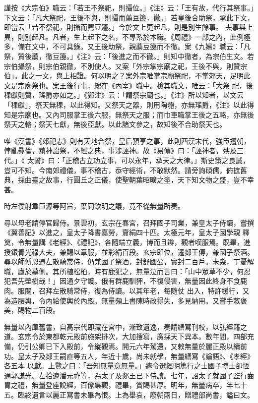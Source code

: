 \begin{pinyinscope}
 謹按《大宗伯》職云：「若王不祭祀，則攝位。」《注》云：「王有故，代行其祭事。」下文云：「凡大祭祀，王後不與，則攝而薦豆籩，徹。」若皇後合助祭，承此下文，即當云「若不祭祀，則攝而薦豆籩。」今於文上更起凡，則是別生餘事。
 夫事與上異，則別起凡。凡者，生上起下之名，不專系於本職。《周禮》一部之內，此例極多，備在文中，不可具錄。又王後助祭，親薦豆籩而不徹。案《九嬪》職云：「凡祭，贊後薦，徹豆籩。」《注》云：「後進之而不徹。」則知中徹者，為宗伯生文。若宗伯攝祭，則宗伯親徹，不別使人。又案「外宗掌宗廟之祀，王後不與，則贊宗伯」。此之一文，與上相證。何以明之？案外宗唯掌宗廟祭祀，不掌郊天，足明此文是宗廟祭也。案王後行事，總在《內宰》職中。檢其職文，唯云：「大祭
 祀，後稞獻則贊，瑤爵亦如之。」《鄭注》云：「謂祭宗廟也。」《注》所以知者，以文云「稞獻」，祭天無稞，以此得知。又祭天之器，則用陶匏，亦無瑤爵，《注》以此得知是宗廟也。又內司服掌王後六服，無祭天之服；而巾車職掌王後之五輅，亦無後祭天之輅；祭天七獻，無後亞獻。以此諸文參之，故知後不合助祭天也。



 唯《漢書》《郊祀志》則有天地合祭，皇后預享之事，此則西漢末代，強臣擅朝，悖亂彞倫，黷神諂祭，不經之典，事涉誣神。故《易傳》曰：「誣神者，殃及三代。」《
 太誓》曰：「正稽古立功立事，可以永年，承天之大律。」斯史策之良誡，豈可不知。今南郊禮儀，事不稽古，忝守經術，不敢默然。請旁詢碩儒，俯摭舊典，採曲臺之故事，行圓丘之正儀，使聖朝葉昭曠之塗，天下知文物之盛，豈不幸甚。



 時左僕射韋巨源等阿旨，葉同欽明之議，竟不從無量所奏。



 尋以母老請停官歸侍。景雲初，玄宗在春宮，召拜國子司業，兼皇太子侍讀，嘗撰《翼善記》以進之，皇太子降書嘉勞，齎絹四十匹。太極元年，皇太子國學親
 釋奠，令無量講《老經》、《禮記》，各隨端立義，博而且辯，觀者嘆服焉。既畢，進授銀青光祿大夫，兼賜以章服，並彩絹百段。玄宗即位，遷郯王傅，兼國子祭酒。尋以師傅恩遷左散騎常侍，仍兼國子祭酒，封舒國公，實封二百戶。未幾，丁憂解職，廬於墓側。其所植松柏，時有鹿犯之，無量泣而言曰：「山中眾草不少，何忍犯吾先塋樹哉！」因通夕守護。俄有群鹿馴狎，不復侵害，無量因此終身不食鹿肉。服闋，召拜左散騎常侍，復為侍讀。以其年老，每隨仗
 出入，特許緩行，又為造腰輿，令內給使輿於內殿。無量頻上書陳時政得失，多見納用。又嘗手敕褒美，賜物二百段。



 無量以內庫舊書，自高宗代即藏在宮中，漸致遺逸，奏請繕寫刊校，以弘經籍之道。玄宗令於東都乾元殿前施架排次，大加搜寫，廣採天下異本。數年間，四部充備，仍引公卿已下入殿前，令縱觀焉。開元六年駕還，又敕無量於麗正殿以續前功。皇太子及郯王嗣直等五人，年近十歲，尚未就學，無量繕寫《論語》、《孝經》各五本
 以獻。上覽之曰：「吾知無量意無量。」遽令選經明篤行之士國子博士卻恆通郭謙光、左拾遺潘元祚等，為太子及郯王已下侍讀。七年，詔太子就國子監行齒胄之禮，無量登座說經，百僚集觀，禮畢，賞賜甚厚。明年，無量病卒，年七十五。臨終遺言以麗正寫書未畢為恨。上為舉哀，廢朝兩日，贈禮部尚書，謚曰文。




\end{pinyinscope}
